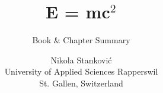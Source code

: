 \documentclass[a4paper,12pt]{scrreprt}
\newcommand{\documentauthors}{Nikola Stanković}
\newcommand{\documenttitel}{E = mc$^2$}
\newcommand{\documentsubtitel}{Book \& Chapter Summary}
\begin{document}
\author{\documentauthors \\ University of Applied Sciences Rapperswil \\ St. Gallen, Switzerland}

\title{\documenttitel}
\subtitle{\documentsubtitel}
\maketitle
\tableofcontents








\end{document}

